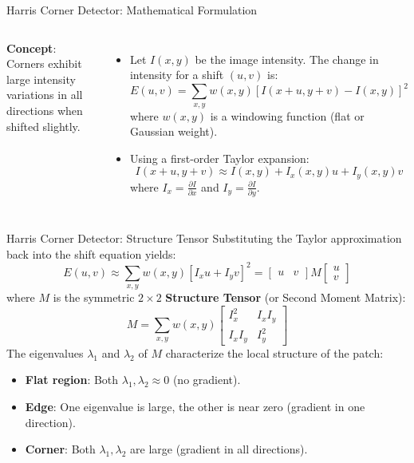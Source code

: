 \documentclass[aspectratio=169,10pt]{beamer}
\begin{document}
\begin{frame}{Harris Corner Detector: Mathematical Formulation}
\begin{columns}[T,onlytextwidth]
\small
\textbf{Concept}: Corners exhibit large intensity variations in all directions when shifted slightly.
\begin{itemize}
    \item Let $I(x,y)$ be the image intensity. The change in intensity for a shift $(u, v)$ is:
    \[
    E(u,v) = \sum_{x,y} w(x,y) \left[ I(x+u, y+v) - I(x,y) \right]^2
    \]
    where $w(x,y)$ is a windowing function (flat or Gaussian weight).
    \item Using a first-order Taylor expansion:
    \[
    I(x+u, y+v) \approx I(x,y) + I_x(x,y)u + I_y(x,y)v
    \]
    where $I_x = \frac{\partial I}{\partial x}$ and $I_y = \frac{\partial I}{\partial y}$.
\end{itemize}
\centering
{}
\end{columns}
\end{frame}

\begin{frame}{Harris Corner Detector: Structure Tensor}
\small
Substituting the Taylor approximation back into the shift equation yields:
\[
E(u,v) \approx \sum_{x,y} w(x,y) \left[ I_x u + I_y v \right]^2 = \begin{bmatrix} u & v \end{bmatrix} M \begin{bmatrix} u \\ v \end{bmatrix}
\]
where $M$ is the symmetric $2\times 2$ \textbf{Structure Tensor} (or Second Moment Matrix):
\[
M = \sum_{x,y} w(x,y) \begin{bmatrix} I_x^2 & I_x I_y \\ I_x I_y & I_y^2 \end{bmatrix}
\]
The eigenvalues $\lambda_1$ and $\lambda_2$ of $M$ characterize the local structure of the patch:
\begin{itemize}
    \item \textbf{Flat region}: Both $\lambda_1, \lambda_2 \approx 0$ (no gradient).
    \item \textbf{Edge}: One eigenvalue is large, the other is near zero (gradient in one direction).
    \item \textbf{Corner}: Both $\lambda_1, \lambda_2$ are large (gradient in all directions).
\end{itemize}
\end{frame}
\end{document}
